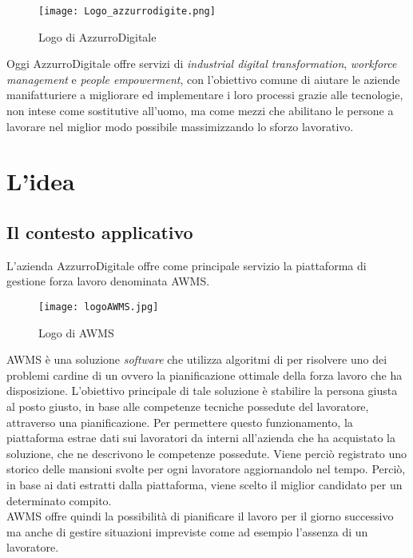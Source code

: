 \begin{figure}[h]
	\begin{center}
		\texttt{[image: Logo\_azzurrodigite.png]}
			\caption{Logo di AzzurroDigitale}
	\end{center}
\end{figure}
\pagebreak

Oggi AzzurroDigitale offre servizi di \emph{industrial digital transformation}, \emph{workforce management} e \emph{people empowerment}, con l'obiettivo comune di aiutare le aziende manifatturiere a migliorare ed implementare i loro processi grazie alle tecnologie, non intese come sostitutive all’uomo, ma come mezzi che abilitano le persone a lavorare nel miglior modo possibile massimizzando lo sforzo lavorativo.\\

\section{L'idea}

\subsection{Il contesto applicativo}
L'azienda AzzurroDigitale offre come principale servizio la piattaforma di gestione forza lavoro denominata \gls{AWMS}.\\
	\begin{figure}[!h] 
		\begin{center}
			\texttt{[image: logoAWMS.jpg]}
			\caption{Logo di AWMS}
		\end{center}
	\end{figure}

\gls{AWMS} è una soluzione \emph{software} che utilizza algoritmi di  per risolvere uno dei problemi cardine di un  ovvero la pianificazione ottimale della forza lavoro che ha disposizione. L'obiettivo principale di tale soluzione è stabilire la persona giusta al posto giusto, in base alle competenze tecniche possedute del lavoratore, attraverso una pianificazione. Per permettere questo funzionamento, la piattaforma estrae dati sui lavoratori da  interni all'azienda che ha acquistato la soluzione, che ne descrivono le competenze possedute. Viene perciò registrato uno storico delle mansioni svolte per ogni lavoratore aggiornandolo nel tempo. Perciò, in base ai dati estratti dalla piattaforma, viene scelto il miglior candidato per un determinato compito. \\ \gls{AWMS} offre quindi la possibilità di pianificare il lavoro per il giorno successivo ma anche di gestire situazioni impreviste come ad esempio l'assenza di un lavoratore.

